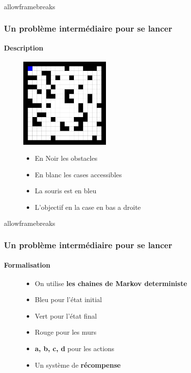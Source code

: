 \documentclass[8pt]{beamer}
\begin{document}
\begin{frame}{allowframebreaks}{\label{2}}
  \frametitle{Un problème intermédiaire pour se lancer}
  \framesubtitle{Description}

  \begin{figure}
    \begin{minipage}[c]{.46\linewidth}
      \centering
      \includegraphics[width=45mm]{map_q-learning.png}
    \end{minipage}
    \hfill%
    \begin{minipage}[c]{.46\linewidth}
      \centering
      \begin{itemize}
      \item En Noir les obstacles \break
      \item En blanc les cases accessibles \break
      \item La souris est en bleu \break
      \item L'objectif en la case en bas a droite \break
  \end{itemize}
    \end{minipage}
  \end{figure}
 
\end{frame}

\begin{frame}{allowframebreaks}{\label{2}}
  \frametitle{Un problème intermédiaire pour se lancer}
  \framesubtitle{Formalisation}
  \begin{figure}
    \begin{minipage}[c]{.55\linewidth}
      \centering
      
    \end{minipage}
    \hfill%
    \begin{minipage}[c]{.37\linewidth}
      \centering
      \begin{itemize}
      \item On utilise \textbf{les chaines de Markov deterministe}
    \item {\color{blue} Bleu} pour l'état initial
    \item {\color{green} Vert} pour l'état final
    \item {\color{red} Rouge} pour les murs
    \item \textbf{a, b, c, d} pour les actions
    \item Un système de \textbf{récompense}
      \end{itemize}
    \end{minipage}
  \end{figure}
\end{frame}
\end{document}
